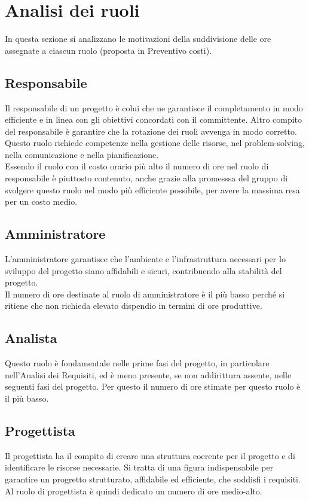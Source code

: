 \section{Analisi dei ruoli}
In questa sezione si analizzano le motivazioni della suddivisione delle ore assegnate a ciascun ruolo (proposta in Preventivo costi). 


\subsection{Responsabile}
Il responsabile di un progetto è colui che ne garantisce il completamento in modo efficiente e in linea con gli obiettivi concordati con il committente. Altro compito del responsabile è garantire che la rotazione dei ruoli avvenga in modo corretto. Questo ruolo richiede competenze nella gestione delle risorse, nel problem-solving, nella comunicazione e nella pianificazione. 
\\
Essendo il ruolo con il costo orario più alto il numero di ore nel ruolo di responsabile è piuttosto contenuto, anche grazie alla promesssa del gruppo di svolgere questo ruolo nel modo più efficiente possibile, per avere la massima resa per un costo medio.

\subsection{Amministratore}

L'amministratore garantisce che l'ambiente e l'infrastruttura necessari per lo sviluppo del progetto siano affidabili e sicuri, contribuendo alla stabilità del progetto.
\\
Il numero di ore destinate al ruolo di amministratore è il più basso perché si ritiene che non richieda elevato dispendio in termini di ore produttive.

\subsection{Analista}
Questo ruolo è fondamentale nelle prime fasi del progetto, in particolare nell'Analisi dei Requisiti, ed è meno presente, se non addirittura assente, nelle seguenti fasi del progetto. Per questo il numero di ore stimate per questo ruolo è il più basso.

\subsection{Progettista}
Il progettista ha il compito di creare una struttura coerente per il progetto e di identificare le risorse necessarie. Si tratta di una figura indispensabile per garantire un progretto strutturato, affidabile ed efficiente, che soddisfi i requisiti.
\\
Al ruolo di progettista è quindi dedicato un numero di ore medio-alto.

